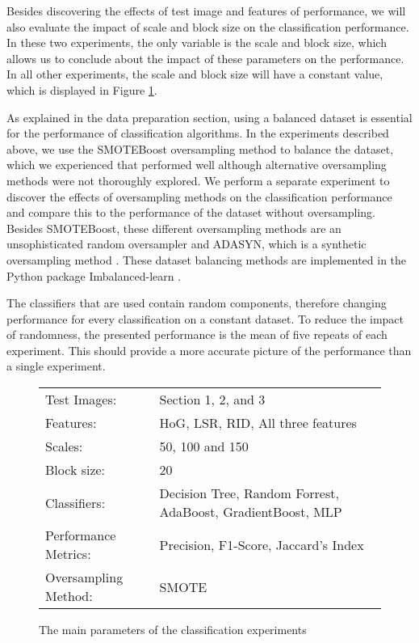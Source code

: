 Besides discovering the effects of test image and features of performance, we will also evaluate the impact of scale and block size on the classification performance. In these two experiments, the only variable is the scale and block size, which allows us to conclude about the impact of these parameters on the performance. In all other experiments, the scale and block size will have a constant value, which is displayed in Figure \ref{fig:params}.

As explained in the data preparation section, using a balanced dataset is essential for the performance of classification algorithms. In the experiments described above, we use the SMOTEBoost \cite{chawla2003smoteboost} oversampling method to balance the dataset, which we experienced that performed well although alternative oversampling methods were not thoroughly explored.  We perform a separate experiment to discover the effects of oversampling methods on the classification performance and compare this to the performance of the dataset without oversampling. Besides SMOTEBoost, these different oversampling methods are an unsophisticated random oversampler and ADASYN, which is a synthetic oversampling method \cite{he2008adasyn}. These dataset balancing methods are implemented in the Python package Imbalanced-learn \cite{lemaitre2017imbalanced}.

The classifiers that are used contain random components, therefore changing performance for every classification on a constant dataset. To reduce the impact of randomness, the presented performance is the mean of five repeats of each experiment. This should provide a more accurate picture of the performance than a single experiment.

\begin{figure}
	\centering
	\begin{tabular}{|ll|}
		\hline
		Test Images: & Section 1, 2, and 3 \\
		Features: & HoG, LSR, RID, All three features\\
		Scales: & 50, 100 and 150 \\
		Block size: & 20\\
		Classifiers: & Decision Tree, Random Forrest, AdaBoost, GradientBoost, MLP \\
		Performance Metrics: & Precision, F1-Score, Jaccard's Index\\
		Oversampling Method: & SMOTE\\
		\hline
	\end{tabular}
	\caption{The main parameters of the classification experiments}
	\label{fig:params}
\end{figure}

